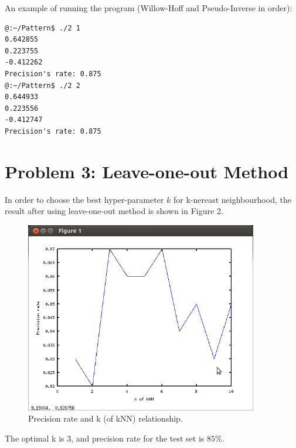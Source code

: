 \documentclass[a4paper, 11pt]{article}
\begin{document}
An example of running the program (Willow-Hoff and Pseudo-Inverse in order):
\begin{verbatim}
@:~/Pattern$ ./2 1
0.642855
0.223755
-0.412262
Precision's rate: 0.875
@:~/Pattern$ ./2 2
0.644933
0.223556
-0.412747
Precision's rate: 0.875
\end{verbatim}

\section*{Problem 3: Leave-one-out Method}
In order to choose the best hyper-parameter $k$ for k-nereast neighbourhood, the result after using leave-one-out method is shown in Figure 2.
\begin{figure}[hbt]
  \centering
  \includegraphics[width=4in]{3.png}
  \caption[Close up of \textit{Hemidactylus} sp.]
  {Precision rate and k (of kNN) relationship.}
\end{figure}
The optimal k is 3, and precision rate for the test set is $85\%$. 
\end{document}
